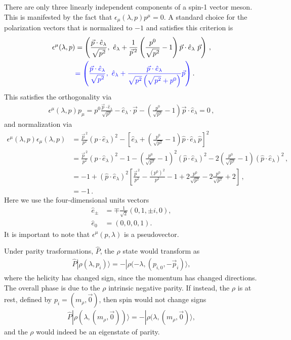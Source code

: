 There are only three linearly independent components of a spin-1 vector meson. This is manifested by the fact that $\epsilon_{\mu}(\lambda, p)p^{\mu}=0$. A standard choice for the polarization vectors that is normalized to $-1$ and satisfies this criterion is
{\mh \begin{align}
\epsilon^{\mu}(\lambda, p) & =
\left(\frac{\vec{p}\cdot\hat{e}_\lambda}{ \sqrt{p^2} }, \ \hat{e}_\lambda + \frac{1}{\vec p^{\,2}} \left( \frac{p^0}{\sqrt{p^2}} - 1  \right) {\vec{p}\cdot\hat{e}_\lambda} \ \vec{p}\right) \,, \\
& {\raul =  \left(\frac{\vec{p}\cdot\hat{e}_\lambda}{ \sqrt{p^2} }, \ \hat{e}_\lambda +   \frac{\vec{p}\cdot\hat{e}_\lambda  }{\sqrt{p^2} \left( \sqrt{p^2} + p^0 \right) }    \vec{p}\right) }\,.
\end{align}
This satisfies the orthogonality via
 \begin{align}
\epsilon^{\mu}(\lambda, p) p_\mu = p^0 \frac{\vec{p}\cdot\hat{e}_\lambda}{\sqrt{p^2} }  -  \hat{e}_\lambda \cdot \vec p - \left( \frac{p^0}{\sqrt{p^2}} - 1  \right) \vec{p}\cdot\hat{e}_\lambda   = 0 \,,
\end{align}
and normalization via
\begin{align}
\epsilon^{\mu}(\lambda, p) \epsilon_{\mu}(\lambda, p) & = \frac{\vec p^{\,2}}{p^2}  ( \hat{p}\cdot\hat{e}_\lambda)^2 - \left [  \hat{e}_\lambda +   \left( \frac{p^0}{\sqrt{p^2}} - 1  \right) { {\hat p}\cdot\hat{e}_\lambda} \  {\hat p}\right] ^2  \\
& = \frac{\vec p^{\,2}}{p^2} ( \hat{p}\cdot\hat{e}_\lambda)^2 - 1 -    \left( \frac{p^0}{\sqrt{p^2}} - 1  \right)^2 ( { {\hat p}\cdot\hat{e}_\lambda} )^2    - 2    \left( \frac{p^0}{\sqrt{p^2}} - 1  \right) ({ {\hat p}\cdot\hat{e}_\lambda}  )^2 \,, \\
& = -1 + ( \hat{p}\cdot\hat{e}_\lambda)^2 \left[ \frac{\vec p^{\,2}}{p^2}  - \frac{(p^0)^2}{p^2} - 1 + 2 \frac{p^0}{\sqrt{p^2}}     - 2    \frac{p^0}{\sqrt{p^2}} + 2      \right ] \,, \\
& = -1 \,.
\end{align}
}
Here we use the four-dimensional units vectors
\begin{align}
\hat{e}_\pm&=\mp\frac{1}{\sqrt{2}}(0,1,\pm i,0),
\\
\hat{e}_0&=(0,0,0,1).
\end{align}
It is important to note that $\epsilon^\mu(p,\lambda)$ is a pseudovector. 

Under parity trasformations, $\hat{P}$, the $\rho$ state would transform as
\begin{align}
\hat{P}|\rho(\lambda, p_i)\rangle
=-|\rho(-\lambda, (p_{i,0},-\vec{p}_i)\rangle,
\end{align}
where the helicity has changed sign, since the momentum has changed directions. The overall phase is due to the $\rho$ intrinsic negative parity. If instead, the $\rho$ is at rest, defined by $p_i=(m_\rho,\vec{0})$, then spin would not change signs
\begin{align}
\hat{P}|\rho(\lambda, (m_\rho,\vec{0}))\rangle
=-|\rho(\lambda, (m_\rho,\vec{0})\rangle,
\end{align}
and the $\rho$ would indeed be an eigenstate of parity. 


